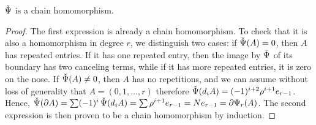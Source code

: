 \begin{lemma}
	$\operatorname{\check{\Psi}}$ is a chain homomorphism. %
\end{lemma}

\begin{proof}
	The first expression is already a chain homomorphism. To check that it is also a homomorphism in degree $r$, we distinguish two cases: if $\operatorname{\check{\Psi}}(A) = 0$, then $A$ has repeated entries. If it has one repeated entry, then the image by $\operatorname{\check{\Psi}}$ of its boundary has two canceling terms, while if it has more repeated entries, it is zero on the nose. If $\operatorname{\check{\Psi}}(A)\neq 0$, then $A$ has no repetitions, and we can assume without loss of generality that $A=(0,1,\ldots,r)$ therefore $\operatorname{\check{\Psi}}(d_iA) = (-1)^{i+2}\rho^{i+1} e_{r-1}$. Hence, $\operatorname{\check{\Psi}}(\partial A) = \sum (-1)^i\operatorname{\check{\Psi}}(d_iA) = \sum \rho^{i+1} e_{r-1} = Ne_{r-1} = \partial \Psi_r(A)$. The second expression is then proven to be a chain homomorphism by induction.
\end{proof}

